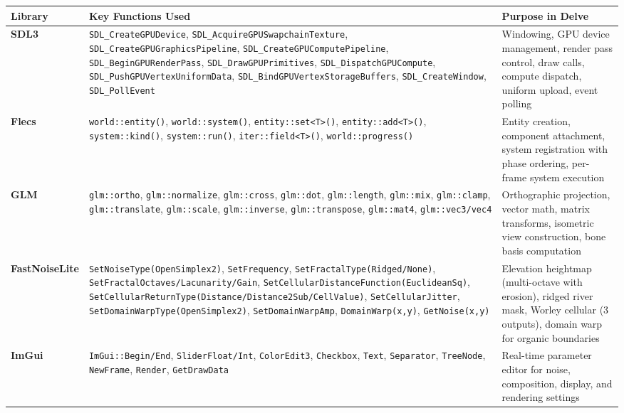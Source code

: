 \documentclass[11pt,a4paper]{article}
\begin{document}
\begin{longtable}{@{}p{2.2cm}p{5.5cm}p{5.5cm}@{}}
\toprule
\textbf{Library} & \textbf{Key Functions Used} & \textbf{Purpose in Delve} \\
\midrule
\endhead
\textbf{SDL3} &
  \texttt{SDL\_CreateGPUDevice}, \texttt{SDL\_AcquireGPUSwapchainTexture}, \texttt{SDL\_CreateGPUGraphicsPipeline}, \texttt{SDL\_CreateGPUComputePipeline}, \texttt{SDL\_BeginGPURenderPass}, \texttt{SDL\_DrawGPUPrimitives}, \texttt{SDL\_DispatchGPUCompute}, \texttt{SDL\_PushGPUVertexUniformData}, \texttt{SDL\_BindGPUVertexStorageBuffers}, \texttt{SDL\_CreateWindow}, \texttt{SDL\_PollEvent} &
  Windowing, GPU device management, render pass control, draw calls, compute dispatch, uniform upload, event polling \\
\midrule
\textbf{Flecs} &
  \texttt{world::entity()}, \texttt{world::system()}, \texttt{entity::set<T>()}, \texttt{entity::add<T>()}, \texttt{system::kind()}, \texttt{system::run()}, \texttt{iter::field<T>()}, \texttt{world::progress()} &
  Entity creation, component attachment, system registration with phase ordering, per-frame system execution \\
\midrule
\textbf{GLM} &
  \texttt{glm::ortho}, \texttt{glm::normalize}, \texttt{glm::cross}, \texttt{glm::dot}, \texttt{glm::length}, \texttt{glm::mix}, \texttt{glm::clamp}, \texttt{glm::translate}, \texttt{glm::scale}, \texttt{glm::inverse}, \texttt{glm::transpose}, \texttt{glm::mat4}, \texttt{glm::vec3/vec4} &
  Orthographic projection, vector math, matrix transforms, isometric view construction, bone basis computation \\
\midrule
\textbf{FastNoiseLite} &
  \texttt{SetNoiseType(OpenSimplex2)}, \texttt{SetFrequency}, \texttt{SetFractalType(Ridged/None)}, \texttt{SetFractalOctaves/Lacunarity/Gain}, \texttt{SetCellularDistanceFunction(EuclideanSq)}, \texttt{SetCellularReturnType(Distance/Distance2Sub/CellValue)}, \texttt{SetCellularJitter}, \texttt{SetDomainWarpType(OpenSimplex2)}, \texttt{SetDomainWarpAmp}, \texttt{DomainWarp(x,y)}, \texttt{GetNoise(x,y)} &
  Elevation heightmap (multi-octave with erosion), ridged river mask, Worley cellular (3 outputs), domain warp for organic boundaries \\
\midrule
\textbf{ImGui} &
  \texttt{ImGui::Begin/End}, \texttt{SliderFloat/Int}, \texttt{ColorEdit3}, \texttt{Checkbox}, \texttt{Text}, \texttt{Separator}, \texttt{TreeNode}, \texttt{NewFrame}, \texttt{Render}, \texttt{GetDrawData} &
  Real-time parameter editor for noise, composition, display, and rendering settings \\

\end{longtable}
\end{document}
